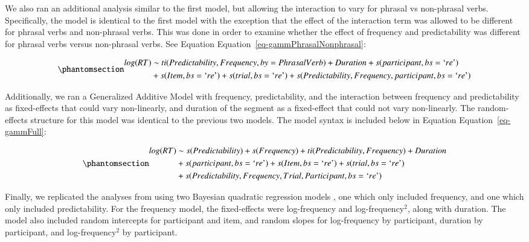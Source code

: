 \documentclass[
  authoryear,
  preprint,
  1p,
  onecolumn]{elsarticle}
\begin{document}
We also ran an additional analysis similar to the first model, but
allowing the interaction to vary for phrasal vs non-phrasal verbs.
Specifically, the model is identical to the first model with the
exception that the effect of the interaction term was allowed to be
different for phrasal verbs and non-phrasal verbs. This was done in
order to examine whether the effect of frequency and predictability was
different for phrasal verbs versus non-phrasal verbs. See Equation
Equation~\ref{eq-gammPhrasalNonphrasal}:

\begin{equation}\phantomsection\label{eq-gammPhrasalNonphrasal}{
\begin{aligned}
log(RT) & \sim ti(Predictability, Frequency, by = PhrasalVerb) + Duration + s(participant, bs = \text{`}re\text{'}) \\ & + s(Item, bs = \text{`}re\text{'}) + s(trial, bs = \text{`}re\text{'}) + s(Predictability, Frequency, participant, bs = \text{`}re\text{'}) 
\end{aligned}
}\end{equation}

Additionally, we ran a Generalized Additive Model with frequency,
predictability, and the interaction between frequency and predictability
as fixed-effects that could vary non-linearly, and duration of the
segment as a fixed-effect that could not vary non-linearly. The
random-effects structure for this model was identical to the previous
two models. The model syntax is included below in Equation
Equation~\ref{eq-gammFull}:

\begin{equation}\phantomsection\label{eq-gammFull}{
\begin{aligned}log(RT) & \sim s(Predictability) + s(Frequency) + ti (Predictability, Frequency) + Duration \\ & + s(participant, bs = \text{`}re\text{'}) + s(Item, bs = \text{`}re\text{'})  + s(trial, bs = \text{`}re\text{'}) \\ & + s(Predictability, Frequency, Trial, Participant, bs = \text{`}re\text{'}) \end{aligned}
}\end{equation}

Finally, we replicated the analyses from \citet{kapatsinski2009} using
two Bayesian quadratic regression models \citep[implemented in
\emph{brms;}][]{brms}, one which only included frequency, and one which
only included predictability. For the frequency model, the fixed-effects
were log-frequency and log-frequency\(^2\), along with duration. The
model also included random intercepts for participant and item, and
random slopes for log-frequency by participant, duration by participant,
and log-frequency\(^2\) by participant.
\end{document}
